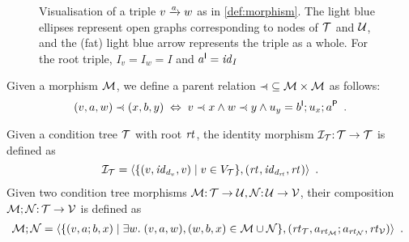 \begin{figure}
\centering

\caption{Visualisation of a triple $\trip vaw$ as in \cref{def:morphism}. The light blue ellipses represent open graphs corresponding to nodes of ${\mathcal{T}}$ and ${\mathcal{U}}$, and the (fat) light blue arrow represents the triple as a whole. For the root triple, $I_v=I_w=I$ and $a^{\mathsf I}={\mathit{id}}_I$}
\label{fig:triple}
\end{figure}

\noindent Given a morphism ${\mathcal{M}}$, we define a parent relation ${\parentof}\subseteq \cM\times \cM$ as follows:
\[ (v,a,w)\parentof (x,b,y) \;\Leftrightarrow\; v\parentof x\wedge w\parentof y \wedge u_y=b\I;u_x;a\P \enspace. \]

\medskip\noindent
Given a condition tree ${\mathcal{T}}$ with root $\mathit{rt}_{}$, the identity morphism ${\mathcal{I}}_{\mathcal{T}}{:}\, {\mathcal{T}}\rightarrow{\mathcal{T}}$ is defined as
\[ {\mathcal{I}}_{\mathcal{T}} = \langle \{{{(v,{\mathit{id}}_{d_v},v)}\mid{v\in V_{\mathcal{T}}}}\},(\mathit{rt}_{},{\mathit{id}}_{d_{\mathit{rt}_{}}},\mathit{rt}_{})\rangle \enspace. \]
Given two condition tree morphisms ${\mathcal{M}}{:}\, {\mathcal{T}}\rightarrow {\mathcal{U}},{\mathcal{N}}{:}\, {\mathcal{U}}\rightarrow {\mathcal{V}}$, their composition ${\mathcal{M}};{\mathcal{N}}{:}\, {\mathcal{T}}\rightarrow {\mathcal{V}}$ is defined as
\[ \cM;\cN =
\begin{array}[t]{@{}l}
	\tupof{\setof{(v,a;b,x) \mid \exists w\st (v,a,w), (w,b,x)\in \cM\cup \cN},(\rt\cT,a_{\rt\cM};a_{\rt\cN},\rt\cV)} \enspace.
\end{array}
\]
